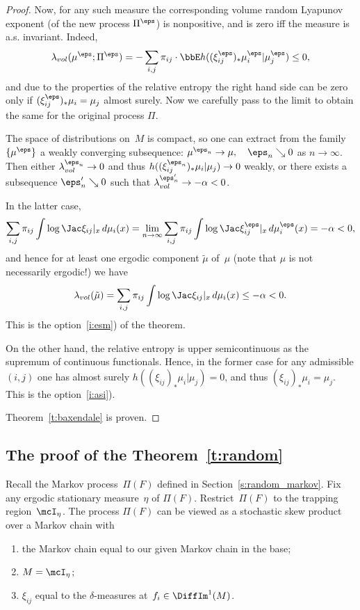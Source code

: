 \documentclass[a4paper,12pt]{amsart}
\begin{document}
\begin{proof}
Now, for any such measure the corresponding volume random Lyapunov exponent (of the new process $\Pi^{\eps}$) is nonpositive, and is zero iff the measure is a.s. invariant. Indeed,
$$
\lambda_{vol}(\mu^{\eps}; \Pi^{\eps})=-\sum_{i,j} \pi_{ij} \cdot \bbE h ((\xi_{ij}^{\eps})_* \mu^{\eps}_i | \mu^{\eps}_j) \le 0,
$$
and due to the properties of the relative entropy the right hand side can be zero only if $(\xi_{ij}^{\eps})_* \mu_i = \mu_j$ almost surely. Now we carefully pass to the limit to obtain the same for the original process $\Pi$.

The space of distributions on~$M$ is compact, so one can extract from the family $\{\mu^{\eps}\}$ a weakly converging subsequence:
$\mu^{\eps_n}\to\mu, \quad \eps_n \searrow 0$ as $n\to \infty$. Then either $\lambda_{vol}^{\eps_n} \to 0$ and thus $h((\xi_{ij}^{\eps_n})_* \mu_i | \mu_j) \to 0$ weakly, or there exists a subsequence $\eps'_n \searrow 0$ such that $\lambda_{vol}^{\eps'_n} \to -\alpha < 0$.

In the latter case,
$$
\sum_{i,j} \pi_{ij} \int \log \Jac \xi_{ij}|_x \, d\mu_i(x) = \lim_{n \to \infty} \sum_{i,j} \pi_{ij} \int \log \Jac \xi_{ij}^\eps|_x \, d\mu_i^\eps(x) = -\alpha < 0,
$$
and hence for at least one ergodic component $\tilde{\mu}$ of~$\mu$ (note that $\mu$ is not necessarily ergodic!) we have
$$
\lambda_{vol} (\tilde{\mu})= \sum_{i,j} \pi_{ij} \int \log \Jac \xi_{ij}|_x \, d\mu_i(x) \le -\alpha < 0.
$$
This is the option~\ref{i:esm}) of the theorem.

On the other hand, the relative entropy is upper semicontinuous as the supremum of continuous functionals. Hence, in the former case for any admissible $(i,j)$ one has almost surely
$h((\xi_{ij})_* \mu_i | \mu_j) = 0$, and thus $(\xi_{ij})_* \mu_i = \mu_j$. This is the option~\ref{i:asi}).

Theorem~\ref{t:baxendale} is proven.
\end{proof}

\subsection{The proof of the Theorem~\ref{t:random}}


Recall the Markov process~$\Pi(F)$ defined in Section~\ref{s:random_markov}. Fix any ergodic stationary measure~$\eta$ of $\Pi(F)$. Restrict~$\Pi(F)$ to the trapping region~$\mcI_\eta$. The process $\Pi(F)$ can be viewed as a stochastic skew product over a Markov chain with
\begin{enumerate}
  \item the Markov chain equal to our given Markov chain in the base;
  \item $M = \mcI_\eta$;
  \item $\xi_{ij}$ equal to the $\delta$-measures at~$f_i \in \DiffIm^1(M)$.
\end{enumerate}
\end{document}
